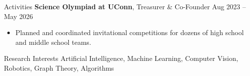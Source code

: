 \documentclass{resume}
\begin{document}


\begin{rSection}{Activities}
    \textbf{Science Olympiad at UConn}, Treasurer \& Co-Founder \hfill Aug 2023 -- May 2026
    \begin{itemize}
        \itemsep -4pt
        \item Planned and coordinated invitational competitions for dozens of high school and middle school teams.
    \end{itemize}

\end{rSection}


\begin{rSection}{Research Interests}
Artificial Intelligence, Machine Learning, Computer Vision, Robotics, Graph Theory, Algorithms
\end{rSection}
\end{document}
